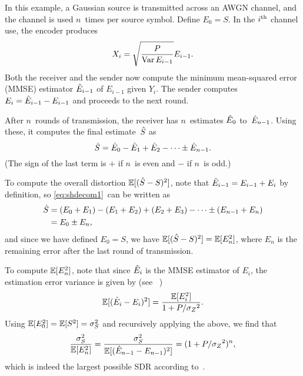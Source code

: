 \begin{example}
  \label{ex:gaussfb}
  In this example, a Gaussian source is transmitted across an AWGN channel, and
  the channel is used $n$~times per source symbol.  Define $E_0 = S$. In the
  $i{^{\text{th}}}$ channel use, the encoder produces
  \begin{equation}
    \label{eq:gaussfbxi}
    X_i = \sqrt{\frac{P}{\operatorname{Var} E_{i-1}}} E_{i-1}.
  \end{equation}
  Both the receiver and the sender now compute the minimum mean-squared
  error (MMSE) estimator $\hat{E}_{i-1}$ of $E_{i-1}$ given $Y_i$. The sender
  computes $E_i = \hat{E}_{i-1} - E_{i-1}$ and proceeds to the next round.

  After $n$~rounds of transmission, the receiver has $n$~estimates $\hat{E}_0$
  to~$\hat{E}_{n-1}$. Using these, it computes the final estimate~${\hat{S}}$ as
  \begin{equation}
    \label{eq:shdecom1}
    {\hat{S}} = \hat{E}_0 - \hat{E}_1 + \hat{E}_2 - \cdots \pm \hat{E}_{n-1}.
  \end{equation}
  (The sign of the last term is $+$ if $n$~is even and $-$ if $n$~is odd.)

  To compute the overall distortion ${\mathbb{E}[({\hat{S}} - S)^2]}$, note that $\hat{E}_{i-1} = E_{i-1} +
  E_i$ by definition, so \eqref{eq:shdecom1}~can be written as
  \begin{align*}
    {\hat{S}} &= (E_0 + E_1) - (E_1 + E_2) + (E_2 + E_3) - \cdots \pm (E_{n-1} + E_n)
    \\
    &= E_0 \pm E_n,
  \end{align*}
  and since we have defined $E_0 = S$, we have ${\mathbb{E}[({\hat{S}} - S)^2]} = \mathbb{E}[E_n^2]$, where $E_n$
  is the remaining error after the last round of transmission.

  To compute $\mathbb{E}[E_n^2]$, note that since $\hat{E}_i$ is the MMSE estimator of
  $E_i$, the estimation error variance is given by (see
  \eg~\cite[Section~8.3]{Scharf1990})
  \begin{equation}
    \label{eq:gaussvardec}
    \mathbb{E}[(\hat{E}_i - E_i)^2] = \frac{\mathbb{E}[E_i^2]}{1 + P/{{\sigma_Z}^2}}.
  \end{equation}
  Using $\mathbb{E}[E_0^2] = \mathbb{E}[S^2] = {\sigma_S^2}$ and recursively applying the above, we find
  that
  \begin{equation*}
    \frac{{\sigma_S^2}}{\mathbb{E}[E_n^2]} = \frac{{\sigma_S^2}}{\mathbb{E}[(\hat{E}_{n-1} - E_{n-1})^2]} =
    (1 + P/{{\sigma_Z}^2})^n,
  \end{equation*}
  which is indeed the largest possible SDR according
  to~.
\end{example}

